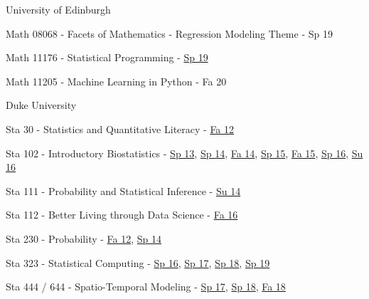 \documentclass[margin,line]{res}
\begin{document}
\begin{resume}
University of Edinburgh

\begin{list1}
\item[] Math 08068 - Facets of Mathematics - Regression Modeling Theme - Sp 19 

\item[] Math 11176 - Statistical Programming - \href{https://statprog-s1-2019.github.io/}{Sp 19}

\item[] Math 11205 - Machine Learning in Python - Fa 20
\end{list1}

Duke University

\begin{list1}
\item[] Sta 30 - Statistics and Quantitative Literacy - \href{http://stat.duke.edu/courses/Spring12/sta10.1}{Fa 12}

\item[] Sta 102 - Introductory Biostatistics - \href{http://stat.duke.edu/courses/Spring13/sta102.001/}{Sp 13}, \href{https://stat.duke.edu/~cr173/Sta102_Sp14/}{Sp 14}, \href{https://stat.duke.edu/~cr173/Sta102_Fa14/}{Fa 14}, \href{https://stat.duke.edu/~cr173/Sta102_Sp15/}{Sp 15}, \href{https://stat.duke.edu/~cr173/Sta102_Fa15/}{Fa 15}, \href{http://stat.duke.edu/~cr173/Sta112_Sp16/}{Sp 16}, \href{http://stat.duke.edu/~cr173/Sta102_Su16/}{Su 16}

\item[] Sta 111 - Probability and Statistical Inference - \href{https://stat.duke.edu/~cr173/Sta111_Su14/}{Su 14}

\item[] Sta 112 - Better Living through Data Science - \href{http://stat.duke.edu/~cr173/Sta112_Fa16/}{Fa 16}

\item[] Sta 230 - Probability - \href{http://stat.duke.edu/courses/Spring12/sta104.1}{Fa 12}, \href{https://stat.duke.edu/~cr173/Sta230_Sp14/}{Sp 14}

\item[] Sta 323 - Statistical Computing - \href{http://stat.duke.edu/~cr173/Sta323_Sp16/}{Sp 16}, \href{http://stat.duke.edu/~cr173/Sta323_Sp17/}{Sp 17}, \href{http://stat.duke.edu/~cr173/Sta323_Sp18/}{Sp 18}, \href{http://stat.duke.edu/~cr173/Sta323_Sp19/}{Sp 19}

\item[] Sta 444 / 644 - Spatio-Temporal Modeling - \href{http://stat.duke.edu/~cr173/Sta444_Sp17/}{Sp 17}, \href{http://stat.duke.edu/~cr173/Sta444_Sp18/}{Sp 18}, \href{http://stat.duke.edu/~cr173/Sta444_Fa18/}{Fa 18}


\end{list1}
\end{resume}
\end{document}
